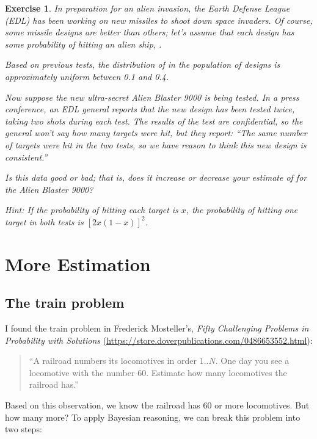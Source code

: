 \documentclass[12pt]{book}
\theoremstyle{exercise}
\newtheorem{exercise}{Exercise}[chapter]
\begin{document}
\begin{exercise}
In preparation for an alien invasion, the Earth Defense League (EDL) has been working on new missiles to shoot down space invaders.  Of course, some missile designs are better than others; let's assume that each design has some probability of hitting an alien ship, .

Based on previous tests, the distribution of  in the population of designs is approximately uniform between 0.1 and 0.4.

Now suppose the new ultra-secret Alien Blaster 9000 is being tested.  In a press conference, an EDL general reports that the new design has been tested twice, taking two shots during each test.  The results of the test are confidential, so the general won't say how many targets were hit, but they report: ``The same number of targets were hit in the two tests, so we have reason to think this new design is consistent.''

Is this data good or bad; that is, does it increase or decrease your estimate of  for the Alien Blaster 9000?

Hint: If the probability of hitting each target is $x$, the probability of hitting one target in both tests is $[2x(1-x)]^2$.
\end{exercise}


\chapter{More Estimation}
\label{estimation}

\section{The train problem}


I found the train problem 
in Frederick Mosteller's, {\it Fifty Challenging Problems in
  Probability with Solutions} (\url{https://store.doverpublications.com/0486653552.html}):

\begin{quote}
``A railroad numbers its locomotives in order $1..N$.  One day you see a
locomotive with the number 60.  Estimate how many locomotives the
railroad has.''
\end{quote}

Based on this observation, we know the railroad has 60 or more
locomotives.  But how many more?  To apply Bayesian reasoning, we
can break this problem into two steps:
\end{document}
